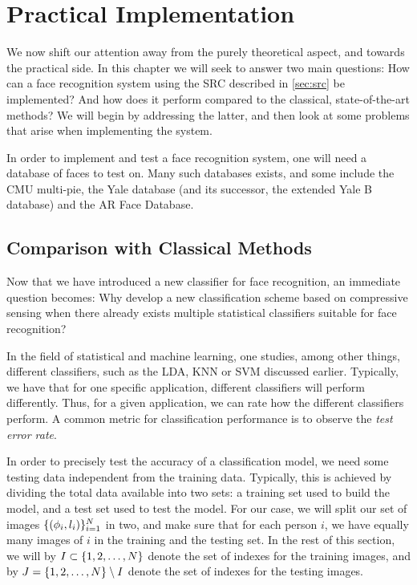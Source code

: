 \chapter{Practical Implementation}
We now shift our attention away from the purely theoretical aspect, and towards the practical side. In this chapter we will seek to answer two main questions: How can a face recognition system using the SRC described in \cref{sec:src} be implemented? And how does it perform compared to the classical, state-of-the-art methods? We will begin by addressing the latter, and then look at some problems that arise when implementing the system.

In order to implement and test a face recognition system, one will need a database of faces to test on. Many such databases exists, and some include the CMU multi-pie, the Yale database (and its successor, the extended Yale B database) and the AR Face Database. 


\section{Comparison with Classical Methods}
Now that we have introduced a new classifier for face recognition, an immediate question becomes: Why develop a new classification scheme based on compressive sensing when there already exists multiple statistical classifiers suitable for face recognition? 

In the field of statistical and machine learning, one studies, among other things, different classifiers, such as the LDA, KNN or SVM discussed earlier. Typically, we have that for one specific application, different classifiers will perform differently. Thus, for a given application, we can rate how the different classifiers perform. A common metric for classification performance is to observe the \textit{test error rate}.

In order to precisely test the accuracy of a classification model, we need some testing data independent from the training data. Typically, this is achieved by dividing the total data available into two sets: a training set used to build the model, and a test set used to test the model. For our case, we will split our set of images $ \{(\phi_{i}, l_{i})\}_{i=1}^{N} $ in two, and make sure that for each person $ i $, we have equally many images of $ i $ in the training and the testing set. In the rest of this section, we will by $ I \subset \{1, 2, \ldots, N\} $ denote the set of indexes for the training images, and by $ J = \{1, 2, \ldots, N\} \setminus I $ denote the set of indexes for the testing images. 

